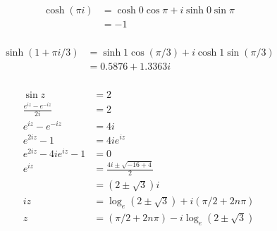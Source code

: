 \documentclass{article}
\begin{document}
\setcounter{subsubsection}{8}
\subsubsection{}

\begin{align*}
  \cosh (\pi i) & = \cosh 0 \cos \pi + i \sinh 0 \sin \pi \\
                & = -1
\end{align*}

\setcounter{subsubsection}{10}
\subsubsection{}

\begin{align*}
  \sinh (1 + \pi i / 3) & = \sinh 1 \cos (\pi / 3) + i \cosh 1 \sin (\pi / 3) \\
                        & = 0.5876 + 1.3363 i
\end{align*}

\setcounter{subsubsection}{14}
\subsubsection{}

\begin{align*}
  \sin z                         & = 2                                               \\
  \frac{e^{i z} - e^{-i z}}{2 i} & = 2                                               \\
  e^{i z} - e^{-i z}             & = 4 i                                             \\
  e^{2 i z} - 1                  & = 4 i e^{i z}                                     \\
  e^{2 i z} - 4 i e^{i z} - 1    & = 0                                               \\
  e^{i z}                        & = \frac{4 i \pm \sqrt{-16 + 4}}{2}                \\
                                 & = (2 \pm \sqrt{3}) i                              \\
  i z                            & = \log_e (2 \pm \sqrt{3}) + i (\pi / 2 + 2 n \pi) \\
  z                              & = (\pi / 2 + 2 n \pi) - i \log_e (2 \pm \sqrt{3}) \\
\end{align*}
\end{document}
